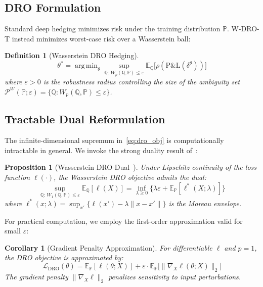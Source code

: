 \documentclass[11pt]{article}
\newtheorem{proposition}[theorem]{Proposition}
\newtheorem{corollary}[theorem]{Corollary}
\newtheorem{definition}[theorem]{Definition}
\newcommand{\E}{\mathbb{E}}
\newcommand{\PP}{\mathbb{P}}
\newcommand{\QQ}{\mathbb{Q}}
\DeclareMathOperator*{\argmin}{arg\,min}
\begin{document}
\subsection{DRO Formulation}

Standard deep hedging minimizes risk under the training distribution $\PP$. W-DRO-T instead minimizes worst-case risk over a Wasserstein ball:

\begin{definition}[Wasserstein DRO Hedging]
\begin{equation}
    \theta^* = \argmin_\theta \sup_{\QQ:\, W_p(\QQ, \PP) \leq \varepsilon} \E_\QQ\bigl[\rho(\mathrm{P\&L}(\delta^\theta))\bigr]
    \label{eq:dro_obj}
\end{equation}
where $\varepsilon > 0$ is the robustness radius controlling the size of the ambiguity set $\mathcal{P}^W(\PP; \varepsilon) = \{\QQ : W_p(\QQ, \PP) \leq \varepsilon\}$.
\end{definition}

\subsection{Tractable Dual Reformulation}

The infinite-dimensional supremum in~\eqref{eq:dro_obj} is computationally intractable in general. We invoke the strong duality result of~\citet{blanchet2019quantifying}:

\begin{proposition}[Wasserstein DRO Dual~\citep{blanchet2019quantifying}]
\label{prop:dual}
Under Lipschitz continuity of the loss function $\ell(\cdot)$, the Wasserstein DRO objective admits the dual:
\begin{equation}
    \sup_{\QQ:\, W_1(\QQ,\PP) \leq \varepsilon} \E_\QQ[\ell(X)] = \inf_{\lambda \geq 0} \bigl\{\lambda\varepsilon + \E_\PP[\ell^*(X; \lambda)]\bigr\}
\end{equation}
where $\ell^*(x; \lambda) = \sup_{x'}\{\ell(x') - \lambda \|x - x'\|\}$ is the Moreau envelope.
\end{proposition}

For practical computation, we employ the first-order approximation valid for small $\varepsilon$:

\begin{corollary}[Gradient Penalty Approximation]
\label{cor:grad_penalty}
For differentiable $\ell$ and $p=1$, the DRO objective is approximated by:
\begin{equation}
    \mathcal{L}_{\mathrm{DRO}}(\theta) = \E_\PP[\ell(\theta; X)] + \varepsilon \cdot \E_\PP\bigl[\|\nabla_X \ell(\theta; X)\|_2\bigr]
    \label{eq:dro_loss}
\end{equation}
The gradient penalty $\|\nabla_X \ell\|_2$ penalizes sensitivity to input perturbations.
\end{corollary}
\end{document}

